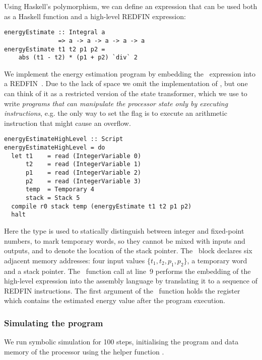 Using Haskell's polymorphism, we can define an expression that can
be used both as a Haskell function and a high-level REDFIN expression:


\begin{verbatim}
energyEstimate :: Integral a
               => a -> a -> a -> a -> a
energyEstimate t1 t2 p1 p2 =
    abs (t1 - t2) * (p1 + p2) `div` 2
\end{verbatim}


\noindent
We implement the energy estimation program by embedding the~
expression into a REDFIN~. Due to the lack of space we omit the
implementation of , but one can think of it as a restricted version
of the  state transformer, which we use to write \emph{programs that
can manipulate the processor state only by executing instructions}, e.g. the
only way to set the  flag is to execute an arithmetic instruction
that might cause an overflow.


\begin{verbatim}
energyEstimateHighLevel :: Script
energyEstimateHighLevel = do
  let t1    = read (IntegerVariable 0)
      t2    = read (IntegerVariable 1)
      p1    = read (IntegerVariable 2)
      p2    = read (IntegerVariable 3)
      temp  = Temporary 4
      stack = Stack 5
  compile r0 stack temp (energyEstimate t1 t2 p1 p2)
  halt
\end{verbatim}
\label{energyEstimateHighLevel}


\noindent
Here the type  is used to statically distinguish between integer
and fixed-point numbers,  to mark temporary words, so they cannot
be mixed with inputs and outputs, and  to denote the location of the
stack pointer. The~ block declares six adjacent memory addresses: four
input values $\{t_1, t_2, p_1, p_2\}$, a temporary word and a stack pointer.
The~ function call at line~9 performs the embedding of the high-level
 expression into the assembly language by translating it to a
sequence of REDFIN instructions. The first argument of the~ function
holds the register~ which contains the estimated energy value after the
program execution.


\subsubsection{Simulating the program}
We run symbolic simulation for 100 steps, initialising the program and data
memory of the processor using the helper function .

